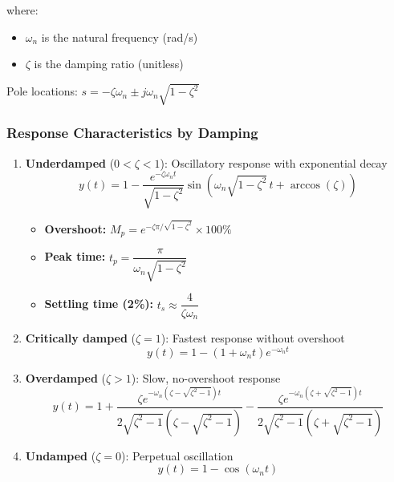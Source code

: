 \noindent where:
\begin{itemize}
    \item $\omega_n$ is the natural frequency (rad/s)
    \item $\zeta$ is the damping ratio (unitless)
\end{itemize}

Pole locations: $s = -\zeta\omega_n \pm j\omega_n\sqrt{1-\zeta^2}$

\subsubsection{Response Characteristics by Damping}

\begin{enumerate}
    \item \textbf{Underdamped} ($0 < \zeta < 1$): Oscillatory response with exponential decay
    \begin{equation}
        y(t) = 1 - \frac{e^{-\zeta\omega_n t}}{\sqrt{1-\zeta^2}} \sin\left(\omega_n\sqrt{1-\zeta^2} \, t + \arccos(\zeta)\right)
    \end{equation}
    \begin{itemize}
        \item \textbf{Overshoot:} $M_p = e^{-\zeta\pi/\sqrt{1-\zeta^2}} \times 100\%$
        \item \textbf{Peak time:} $t_p = \dfrac{\pi}{\omega_n\sqrt{1-\zeta^2}}$
        \item \textbf{Settling time (2\%):} $t_s \approx \dfrac{4}{\zeta\omega_n}$
    \end{itemize}

    \item \textbf{Critically damped} ($\zeta = 1$): Fastest response without overshoot
    \begin{equation}
        y(t) = 1 - (1 + \omega_n t) e^{-\omega_n t}
    \end{equation}

    \item \textbf{Overdamped} ($\zeta > 1$): Slow, no-overshoot response
    \begin{equation}
        y(t) = 1 + \frac{\zeta e^{-\omega_n(\zeta - \sqrt{\zeta^2-1})t}}{2\sqrt{\zeta^2-1}(\zeta - \sqrt{\zeta^2-1})} - \frac{\zeta e^{-\omega_n(\zeta + \sqrt{\zeta^2-1})t}}{2\sqrt{\zeta^2-1}(\zeta + \sqrt{\zeta^2-1})}
    \end{equation}

    \item \textbf{Undamped} ($\zeta = 0$): Perpetual oscillation
    \begin{equation}
        y(t) = 1 - \cos(\omega_n t)
    \end{equation}
\end{enumerate}

